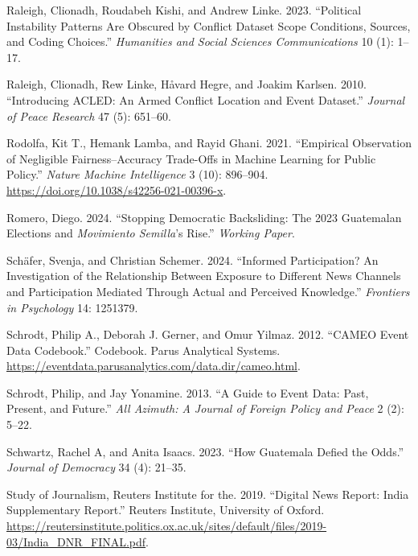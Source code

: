 \documentclass[
  letterpaper,
  DIV=11,
  numbers=noendperiod]{scrartcl}
\newlength{\cslhangindent}
\newlength{\cslentryspacingunit} %
\newenvironment{CSLReferences}[2] %
 {%
  \setlength{\parindent}{0pt}
  \ifodd #1
  \let\oldpar\par
  \def\par{\hangindent=\cslhangindent\oldpar}
  \fi
  \setlength{\parskip}{#2\cslentryspacingunit}
 }%
 {}
\begin{document}
\begin{CSLReferences}{1}{0}
\leavevmode{}%
Raleigh, Clionadh, Roudabeh Kishi, and Andrew Linke. 2023. {``Political
Instability Patterns Are Obscured by Conflict Dataset Scope Conditions,
Sources, and Coding Choices.''} \emph{Humanities and Social Sciences
Communications} 10 (1): 1--17.

\leavevmode{}%
Raleigh, Clionadh, Rew Linke, Håvard Hegre, and Joakim Karlsen. 2010.
{``Introducing ACLED: An Armed Conflict Location and Event Dataset.''}
\emph{Journal of Peace Research} 47 (5): 651--60.

\leavevmode{}%
Rodolfa, Kit T., Hemank Lamba, and Rayid Ghani. 2021. {``Empirical
Observation of Negligible Fairness--Accuracy Trade-Offs in Machine
Learning for Public Policy.''} \emph{Nature Machine Intelligence} 3
(10): 896--904. \url{https://doi.org/10.1038/s42256-021-00396-x}.

\leavevmode{}%
Romero, Diego. 2024. {``Stopping Democratic Backsliding: The 2023
Guatemalan Elections and \emph{Movimiento Semilla}'s Rise.''}
\emph{Working Paper}.

\leavevmode{}%
Schäfer, Svenja, and Christian Schemer. 2024. {``Informed Participation?
An Investigation of the Relationship Between Exposure to Different News
Channels and Participation Mediated Through Actual and Perceived
Knowledge.''} \emph{Frontiers in Psychology} 14: 1251379.

\leavevmode{}%
Schrodt, Philip A., Deborah J. Gerner, and Omur Yilmaz. 2012. {``{CAMEO}
Event Data Codebook.''} Codebook. Parus Analytical Systems.
\url{https://eventdata.parusanalytics.com/data.dir/cameo.html}.

\leavevmode{}%
Schrodt, Philip, and Jay Yonamine. 2013. {``A Guide to Event Data: Past,
Present, and Future.''} \emph{All Azimuth: A Journal of Foreign Policy
and Peace} 2 (2): 5--22.

\leavevmode{}%
Schwartz, Rachel A, and Anita Isaacs. 2023. {``How Guatemala Defied the
Odds.''} \emph{Journal of Democracy} 34 (4): 21--35.

\leavevmode{}%
Study of Journalism, Reuters Institute for the. 2019. {``Digital News
Report: India Supplementary Report.''} Reuters Institute, University of
Oxford.
\url{https://reutersinstitute.politics.ox.ac.uk/sites/default/files/2019-03/India_DNR_FINAL.pdf}.


\end{CSLReferences}
\end{document}
